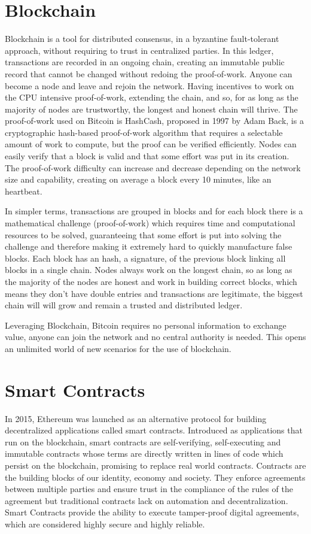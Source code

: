 \section{Blockchain}

Blockchain is a tool for distributed consensus, in a byzantine fault-tolerant approach, without requiring to trust in centralized parties. In this ledger, transactions are recorded in an ongoing chain, creating an immutable public record that cannot be changed without redoing the proof-of-work. Anyone can become a node and leave and rejoin the network. Having incentives to work on the CPU intensive proof-of-work, extending the chain, and so, for as long as the majority of nodes are trustworthy, the longest and honest chain will thrive. The proof-of-work used on Bitcoin is HashCash, proposed in 1997 by Adam Back, is a cryptographic hash-based proof-of-work algorithm that requires a selectable amount of work to compute, but the proof can be verified efficiently. Nodes can easily verify that a block is valid and that some effort was put in its creation. The proof-of-work difficulty can increase and decrease depending on the network size and capability, creating on average a block every 10 minutes, like an heartbeat.

In simpler terms, transactions are grouped in blocks and for each block there is a mathematical challenge (proof-of-work) which requires time and computational resources to be solved, guaranteeing that some effort is put into solving the challenge and therefore making it extremely hard to quickly manufacture false blocks. Each block has an hash, a signature, of the previous block linking all blocks in a single chain. Nodes always work on the longest chain, so as long as the majority of the nodes are honest and work in building correct blocks, which means they don't have double entries and transactions are legitimate, the biggest chain will will grow and remain a trusted and distributed ledger.

Leveraging Blockchain, Bitcoin requires no personal information to exchange value, anyone can join the network and no central authority is needed. This opens an unlimited world of new scenarios for the use of blockchain.



\section{Smart Contracts}

In 2015, Ethereum was launched as an alternative protocol for building decentralized applications called smart contracts. Introduced as applications that run on the blockchain, smart contracts are self-verifying, self-executing and immutable contracts whose terms are directly written in lines of code which persist on the blockchain, promising to replace real world contracts. Contracts are the building blocks of our identity, economy and society. They enforce agreements between multiple parties and ensure trust in the compliance of the rules of the agreement but traditional contracts lack on automation and decentralization. Smart Contracts provide the ability to execute tamper-proof digital agreements, which are considered highly secure and highly reliable. 

